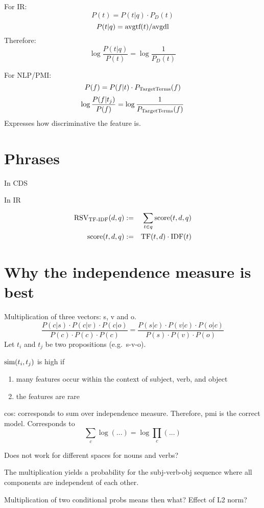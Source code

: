 For IR:
\[
P(t) = P(t|q) \cdot P_D(t)
\]
\[
P(t|q) = \textmd{avgtf}(t) / \textmd{avgdl}
\]
Therefore:
\[
\log\frac{P(t|q)}{P(t)} = \log\frac{1}{P_D(t)}
\]

For NLP/PMI:
\[
P(f) = P(f|t) \cdot P_\textmd{TargetTerms}(f)
\]
\[
\log\frac{P(f|t_j)}{P(f)} = \log\frac{1}{P_\textmd{TargetTerms}(f)}
\]
Expresses how discriminative the feature is.



\section{Phrases}

In CDS


In IR



\begin{eqnarray}
\label{tf-idf-phrase}
\textmd{RSV}_\textmd{TF-IDF}(d,q) &:=& \sum_{t \in q} \textmd{score}(t,d,q)\\
\textmd{score}(t,d,q) &:=&
\textmd{TF}(t,d) \cdot \textmd{IDF}(t)
\end{eqnarray}

\section{Why the independence measure is best}

Multiplication of three vectors: s, v and o.
\[
\frac{
P(c|s) \cdot P(c|v) \cdot P(c|o)}{
P(c) \cdot P(c) \cdot P(c)} =
\frac{
P(s|c) \cdot P(v|c) \cdot P(o|c)
}{
P(s) \cdot P(v) \cdot P(o)
}
\]
Let $t_i$ and $t_j$ be two propositions
(e.g.~s-v-o).

$\textmd{sim}(t_i,t_j)$ is high if
\begin{enumerate}
\item many features occur within the context of subject, verb, and object
\item the features are rare
\end{enumerate}

cos: corresponds to sum over independence measure.
Therefore, pmi is the correct model.
Corresponds to
\[
\sum_c \log(...) = \log \prod_c(...)
\]



Does not work for different
spaces for nouns and verbs?

The multiplication yields a probability
for the subj-verb-obj sequence where all
components are independent of each other.

Multiplication of two conditional probs means then what?
Effect of L2 norm?


